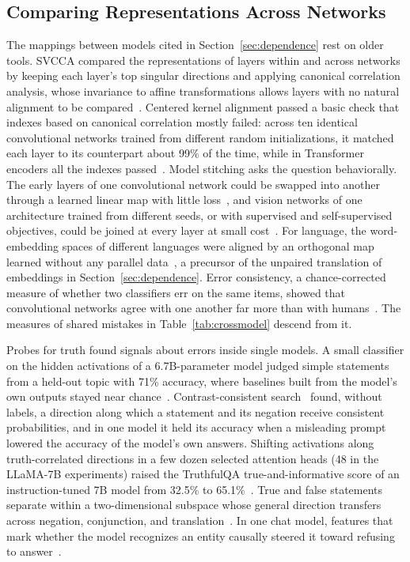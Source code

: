 \documentclass{ieeeaccess}
\begin{document}
\subsection{Comparing Representations Across Networks}
The mappings between models cited in Section~\ref{sec:dependence} rest on older tools. SVCCA compared the representations of layers within and across networks by keeping each layer's top singular directions and applying canonical correlation analysis, whose invariance to affine transformations allows layers with no natural alignment to be compared~\cite{raghu2017svcca}. Centered kernel alignment passed a basic check that indexes based on canonical correlation mostly failed: across ten identical convolutional networks trained from different random initializations, it matched each layer to its counterpart about 99\% of the time, while in Transformer encoders all the indexes passed~\cite{kornblith2019similarity}. Model stitching asks the question behaviorally. The early layers of one convolutional network could be swapped into another through a learned linear map with little loss~\cite{lenc2015understanding}, and vision networks of one architecture trained from different seeds, or with supervised and self-supervised objectives, could be joined at every layer at small cost~\cite{bansal2021revisiting}. For language, the word-embedding spaces of different languages were aligned by an orthogonal map learned without any parallel data~\cite{conneau2018word}, a precursor of the unpaired translation of embeddings in Section~\ref{sec:dependence}. Error consistency, a chance-corrected measure of whether two classifiers err on the same items, showed that convolutional networks agree with one another far more than with humans~\cite{geirhos2020beyond}. The measures of shared mistakes in Table~\ref{tab:crossmodel} descend from it.

Probes for truth found signals about errors inside single models. A small classifier on the hidden activations of a 6.7B-parameter model judged simple statements from a held-out topic with 71\% accuracy, where baselines built from the model's own outputs stayed near chance~\cite{azaria2023internal}. Contrast-consistent search~\cite{burns2023discovering} found, without labels, a direction along which a statement and its negation receive consistent probabilities, and in one model it held its accuracy when a misleading prompt lowered the accuracy of the model's own answers. Shifting activations along truth-correlated directions in a few dozen selected attention heads (48 in the LLaMA-7B experiments) raised the TruthfulQA true-and-informative score of an instruction-tuned 7B model from 32.5\% to 65.1\%~\cite{li2023inference}. True and false statements separate within a two-dimensional subspace whose general direction transfers across negation, conjunction, and translation~\cite{burger2024truth}. In one chat model, features that mark whether the model recognizes an entity causally steered it toward refusing to answer~\cite{ferrando2025know}.
\end{document}
